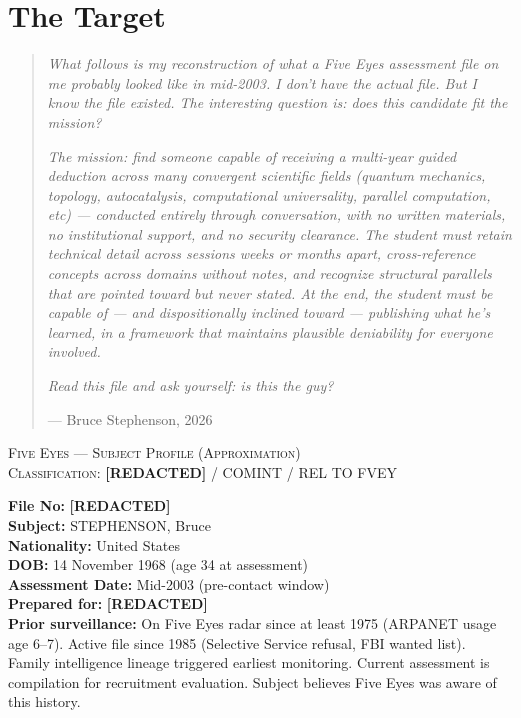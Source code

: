 
\section*{The Target}
\label{record:tgt-the-target}

\begin{quote}\small
\textit{What follows is my reconstruction of what a Five Eyes assessment file on me probably looked like in mid-2003. I don't have the actual file. But I know the file existed. The interesting question is: does this candidate fit the mission?}

\par\vspace{0.5em}
\noindent\colorbox{missionbg}{\parbox{\dimexpr\linewidth-2\fboxsep}{%
\textit{The mission: find someone capable of receiving a multi-year guided deduction across many convergent scientific fields (quantum mechanics, topology, autocatalysis, computational universality, parallel computation, etc) --- conducted entirely through conversation, with no written materials, no institutional support, and no security clearance. The student must retain technical detail across sessions weeks or months apart, cross-reference concepts across domains without notes, and recognize structural parallels that are pointed toward but never stated. At the end, the student must be capable of --- and dispositionally inclined toward --- publishing what he's learned, in a framework that maintains plausible deniability for everyone involved.}%
}}\par\vspace{0.5em}

\textit{Read this file and ask yourself: is this the guy?}
\par\raggedleft --- Bruce Stephenson, 2026\end{quote}

\vspace{1cm}

\begin{center}
\textsc{Five Eyes --- Subject Profile (Approximation)}\\[0.3em]
\textsc{Classification: \textbf{[REDACTED]} / COMINT / REL TO FVEY}
\end{center}

\vspace{0.5cm}

\noindent\textbf{File No:} \textbf{[REDACTED]}\\
\textbf{Subject:} STEPHENSON, Bruce\\
\textbf{Nationality:} United States\\
\textbf{DOB:} 14 November 1968 (age 34 at assessment)\\
\textbf{Assessment Date:} Mid-2003 (pre-contact window)\\
\textbf{Prepared for:} \textbf{[REDACTED]}\\
\textbf{Prior surveillance:} On Five Eyes radar since at least 1975 (ARPANET usage age 6--7). Active file since 1985 (Selective Service refusal, FBI wanted list). Family intelligence lineage triggered earliest monitoring. Current assessment is compilation for recruitment evaluation. Subject believes Five Eyes was aware of this history.

